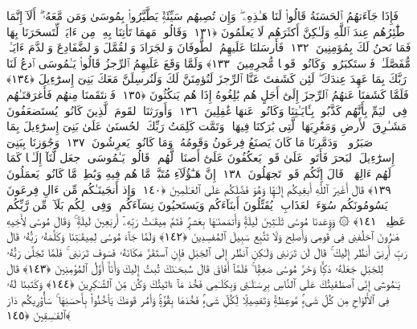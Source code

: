  فَإِذَا جَآءَتهُمُ ٱلحَسَنَةُ قَالُوا۟ لَنَا هَـٰذِهِۦ ۖ وَإِن تُصِبهُم سَيِّئَةٌۭ يَطَّيَّرُوا۟ بِمُوسَىٰ وَمَن مَّعَهُۥٓ ۗ أَلَآ إِنَّمَا طَٰٓئِرُهُم عِندَ ٱللَّهِ وَلَـٰكِنَّ أَكثَرَهُم لَا يَعلَمُونَ ﴿١٣١﴾
 وَقَالُوا۟ مَهمَا تَأتِنَا بِهِۦ مِن ءَايَةٍۢ لِّتَسحَرَنَا بِهَا فَمَا نَحنُ لَكَ بِمُؤمِنِينَ ﴿١٣٢﴾
 فَأَرسَلنَا عَلَيهِمُ ٱلطُّوفَانَ وَٱلجَرَادَ وَٱلقُمَّلَ وَٱلضَّفَادِعَ وَٱلدَّمَ ءَايَـٰتٍۢ مُّفَصَّلَـٰتٍۢ فَٱستَكبَرُوا۟ وَكَانُوا۟ قَومًۭا مُّجرِمِينَ ﴿١٣٣﴾
 وَلَمَّا وَقَعَ عَلَيهِمُ ٱلرِّجزُ قَالُوا۟ يَـٰمُوسَى ٱدعُ لَنَا رَبَّكَ بِمَا عَهِدَ عِندَكَ ۖ لَئِن كَشَفتَ عَنَّا ٱلرِّجزَ لَنُؤمِنَنَّ لَكَ وَلَنُرسِلَنَّ مَعَكَ بَنِىٓ إِسرَٰٓءِيلَ ﴿١٣٤﴾
 فَلَمَّا كَشَفنَا عَنهُمُ ٱلرِّجزَ إِلَىٰٓ أَجَلٍ هُم بَٰلِغُوهُ إِذَا هُم يَنكُثُونَ ﴿١٣٥﴾
 فَٱنتَقَمنَا مِنهُم فَأَغرَقنَـٰهُم فِى ٱليَمِّ بِأَنَّهُم كَذَّبُوا۟ بِـَٔايَـٰتِنَا وَكَانُوا۟ عَنهَا غَٰفِلِينَ ﴿١٣٦﴾
 وَأَورَثنَا ٱلقَومَ ٱلَّذِينَ كَانُوا۟ يُستَضعَفُونَ مَشَـٰرِقَ ٱلأَرضِ وَمَغَٰرِبَهَا ٱلَّتِى بَٰرَكنَا فِيهَا ۖ وَتَمَّت كَلِمَتُ رَبِّكَ ٱلحُسنَىٰ عَلَىٰ بَنِىٓ إِسرَٰٓءِيلَ بِمَا صَبَرُوا۟ ۖ وَدَمَّرنَا مَا كَانَ يَصنَعُ فِرعَونُ وَقَومُهُۥ وَمَا كَانُوا۟ يَعرِشُونَ ﴿١٣٧﴾
 وَجَٰوَزنَا بِبَنِىٓ إِسرَٰٓءِيلَ ٱلبَحرَ فَأَتَوا۟ عَلَىٰ قَومٍۢ يَعكُفُونَ عَلَىٰٓ أَصنَامٍۢ لَّهُم ۚ قَالُوا۟ يَـٰمُوسَى ٱجعَل لَّنَآ إِلَـٰهًۭا كَمَا لَهُم ءَالِهَةٌۭ ۚ قَالَ إِنَّكُم قَومٌۭ تَجهَلُونَ ﴿١٣٨﴾
 إِنَّ هَـٰٓؤُلَآءِ مُتَبَّرٌۭ مَّا هُم فِيهِ وَبَٰطِلٌۭ مَّا كَانُوا۟ يَعمَلُونَ ﴿١٣٩﴾
 قَالَ أَغَيرَ ٱللَّهِ أَبغِيكُم إِلَـٰهًۭا وَهُوَ فَضَّلَكُم عَلَى ٱلعَـٰلَمِينَ ﴿١٤٠﴾
 وَإِذ أَنجَينَـٰكُم مِّن ءَالِ فِرعَونَ يَسُومُونَكُم سُوٓءَ ٱلعَذَابِ ۖ يُقَتِّلُونَ أَبنَآءَكُم وَيَستَحيُونَ نِسَآءَكُم ۚ وَفِى ذَٟلِكُم بَلَآءٌۭ مِّن رَّبِّكُم عَظِيمٌۭ ﴿١٤١﴾
 ۞ وَوَٟعَدنَا مُوسَىٰ ثَلَـٰثِينَ لَيلَةًۭ وَأَتمَمنَـٰهَا بِعَشرٍۢ فَتَمَّ مِيقَـٰتُ رَبِّهِۦٓ أَربَعِينَ لَيلَةًۭ ۚ وَقَالَ مُوسَىٰ لِأَخِيهِ هَـٰرُونَ ٱخلُفنِى فِى قَومِى وَأَصلِح وَلَا تَتَّبِع سَبِيلَ ٱلمُفسِدِينَ ﴿١٤٢﴾
 وَلَمَّا جَآءَ مُوسَىٰ لِمِيقَـٰتِنَا وَكَلَّمَهُۥ رَبُّهُۥ قَالَ رَبِّ أَرِنِىٓ أَنظُر إِلَيكَ ۚ قَالَ لَن تَرَىٰنِى وَلَـٰكِنِ ٱنظُر إِلَى ٱلجَبَلِ فَإِنِ ٱستَقَرَّ مَكَانَهُۥ فَسَوفَ تَرَىٰنِى ۚ فَلَمَّا تَجَلَّىٰ رَبُّهُۥ لِلجَبَلِ جَعَلَهُۥ دَكًّۭا وَخَرَّ مُوسَىٰ صَعِقًۭا ۚ فَلَمَّآ أَفَاقَ قَالَ سُبحَـٰنَكَ تُبتُ إِلَيكَ وَأَنَا۠ أَوَّلُ ٱلمُؤمِنِينَ ﴿١٤٣﴾
 قَالَ يَـٰمُوسَىٰٓ إِنِّى ٱصطَفَيتُكَ عَلَى ٱلنَّاسِ بِرِسَـٰلَـٰتِى وَبِكَلَـٰمِى فَخُذ مَآ ءَاتَيتُكَ وَكُن مِّنَ ٱلشَّـٰكِرِينَ ﴿١٤٤﴾
 وَكَتَبنَا لَهُۥ فِى ٱلأَلوَاحِ مِن كُلِّ شَىءٍۢ مَّوعِظَةًۭ وَتَفصِيلًۭا لِّكُلِّ شَىءٍۢ فَخُذهَا بِقُوَّةٍۢ وَأمُر قَومَكَ يَأخُذُوا۟ بِأَحسَنِهَا ۚ سَأُو۟رِيكُم دَارَ ٱلفَـٰسِقِينَ ﴿١٤٥﴾
